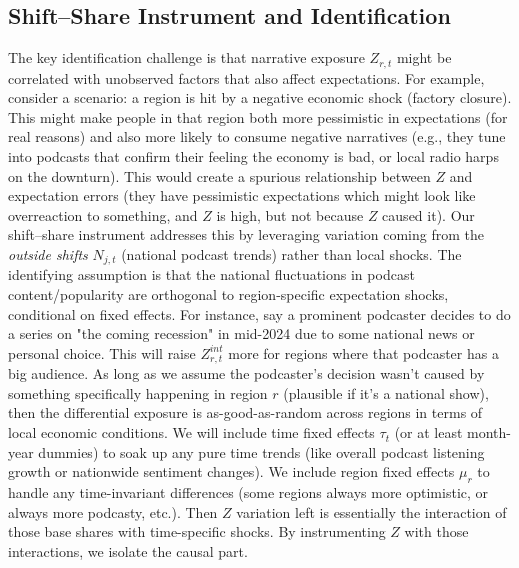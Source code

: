 \documentclass[12pt]{article}
\begin{document}
\subsection{Shift--Share Instrument and Identification}
The key identification challenge is that narrative exposure $Z_{r,t}$ might be correlated with unobserved factors that also affect expectations. For example, consider a scenario: a region is hit by a negative economic shock (factory closure). This might make people in that region both more pessimistic in expectations (for real reasons) and also more likely to consume negative narratives (e.g., they tune into podcasts that confirm their feeling the economy is bad, or local radio harps on the downturn). This would create a spurious relationship between $Z$ and expectation errors (they have pessimistic expectations which might look like overreaction to something, and $Z$ is high, but not because $Z$ caused it).
Our shift–share instrument addresses this by leveraging variation coming from the \textit{outside shifts} $N_{j,t}$ (national podcast trends) rather than local shocks. The identifying assumption is that the national fluctuations in podcast content/popularity are orthogonal to region-specific expectation shocks, conditional on fixed effects. For instance, say a prominent podcaster decides to do a series on "the coming recession" in mid-2024 due to some national news or personal choice. This will raise $Z^{int}_{r,t}$ more for regions where that podcaster has a big audience. As long as we assume the podcaster's decision wasn't caused by something specifically happening in region $r$ (plausible if it's a national show), then the differential exposure is as-good-as-random across regions in terms of local economic conditions.
We will include time fixed effects $\tau_t$ (or at least month-year dummies) to soak up any pure time trends (like overall podcast listening growth or nationwide sentiment changes). We include region fixed effects $\mu_r$ to handle any time-invariant differences (some regions always more optimistic, or always more podcasty, etc.). Then $Z$ variation left is essentially the interaction of those base shares with time-specific shocks. By instrumenting $Z$ with those interactions, we isolate the causal part.
\end{document}
